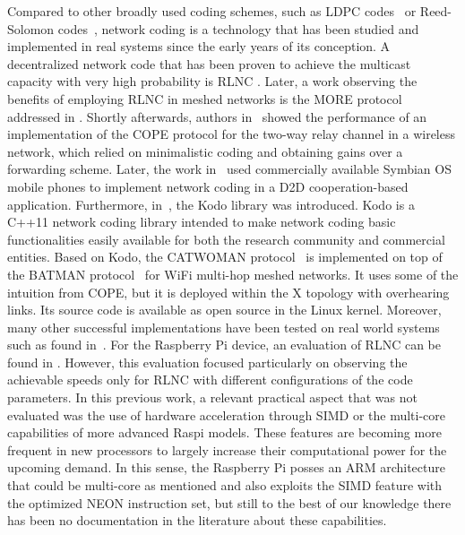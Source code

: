 Compared to other broadly used coding schemes, such as \ac{LDPC}
codes~\cite{gallager1962low} or Reed-Solomon
codes~\cite{reed1960polynomial}, network coding is a technology that
has been studied and implemented in real systems since the early years of
its conception. A decentralized network code that has been proven
to achieve the multicast capacity with very high probability is
\ac{RLNC} \cite{ho2006random}. Later, a work observing the
benefits of employing \ac{RLNC} in meshed networks is the MORE protocol
addressed in \cite{chachulski2007more}. Shortly afterwards, authors
in~\cite{katti2008xors} showed the performance of an implementation
of the COPE protocol for the two-way relay channel
in a wireless network, which relied on minimalistic coding and obtaining
gains over a forwarding scheme. Later, the work
in~\cite{pedersen2008implementation} used commercially available
Symbian OS mobile phones to implement network coding in a
\ac{D2D} cooperation-based application. Furthermore,
in~\cite{kodo2011pedersen}, the Kodo library was introduced. Kodo is
a C++11 network coding library intended to make network coding
basic functionalities easily available for both the research community
and commercial entities. Based on Kodo, the CATWOMAN
protocol~\cite{hundeboll2012catwoman} is implemented on top of the
BATMAN protocol~\cite{johnson2008simple} for WiFi multi-hop meshed
networks. It uses some of the intuition from COPE, but it is deployed
within the X topology with overhearing links. Its source code is available
as open source in the Linux kernel. Moreover, many other successful
implementations have been tested on real world systems such as
found in~\cite{pahlevani2013playncool,krigslund2013core,
paramanathan2013leanandmean,seferoglu2011i2nc}. For the Raspberry Pi device, an
evaluation of \ac{RLNC} can be found in \cite{paramanathan2014sharing}.
However, this evaluation focused particularly on observing the achievable
speeds only for \ac{RLNC} with different configurations of
the code parameters. In this previous work, a relevant practical aspect that
was not evaluated was the use of hardware acceleration through \ac{SIMD} or
the multi-core capabilities of more advanced \ac{Raspi} models. These features are
becoming more frequent in new processors to largely increase their computational
power for the upcoming demand. In this sense, the Raspberry Pi posses an \ac{ARM}
architecture that could be multi-core as mentioned and also exploits the \ac{SIMD}
feature with the optimized NEON instruction set, but still to the best of our knowledge
there has been no documentation in the literature about these capabilities.

